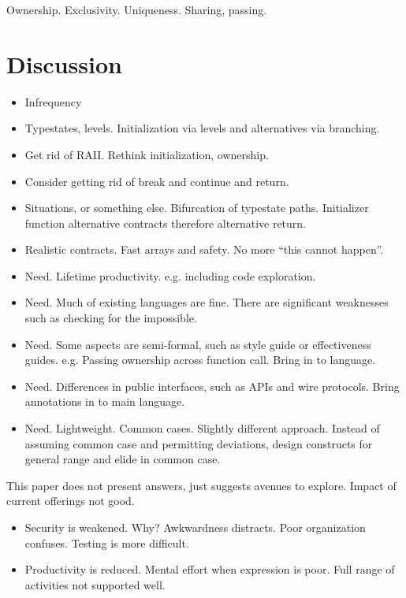 \documentclass[10pt]{amsart}
\begin{document}
Ownership.  Exclusivity.  Uniqueness.  Sharing, passing.

\section{Discussion}

\begin{itemize}
\item Infrequency
\item Typestates, levels.  Initialization via levels and alternatives
  via branching.
\item Get rid of RAII.  Rethink initialization, ownership.
\item Consider getting rid of break and continue and return.
\item Situations, or something else.  Bifurcation of typestate paths.
  Initializer function alternative contracts therefore alternative
  return.
\item Realistic contracts.  Fast arrays and safety.  No more ``this
  cannot happen''.
\item Need.  Lifetime productivity.  e.g. including code exploration.
\item Need.  Much of existing languages are fine.  There are
  significant weaknesses such as checking for the impossible.
\item Need.  Some aspects are semi-formal, such as style guide or
  effectiveness guides.  e.g. Passing ownership across function call.
  Bring in to language.
\item Need.  Differences in public interfaces, such as APIs and wire
  protocols.  Bring annotations in to main language.
\item Need.  Lightweight.  Common cases.  Slightly different approach.
  Instead of assuming common case and permitting deviations, design
  constructs for general range and elide in common case.
\end{itemize}

This paper does not present answers, just suggests avenues to
explore.  Impact of current offerings not good.
\begin{itemize}
\item Security is weakened.  Why?  Awkwardness distracts.  Poor
  organization confuses.  Testing is more difficult.
\item Productivity is reduced.  Mental effort when expression is poor.
  Full range of activities not supported well.
\end{itemize}
\end{document}
